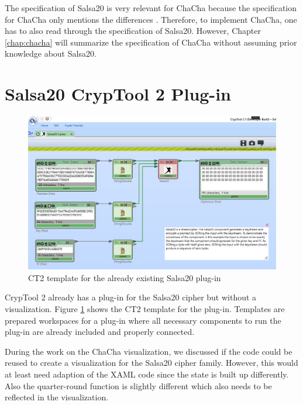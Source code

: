 The specification of Salsa20 is very relevant for ChaCha because the specification for ChaCha only mentions the differences \cite{chachaspec}. Therefore, to implement ChaCha, one has to also read through the specification of Salsa20.  However, Chapter \ref{chap:chacha} will summarize the specification of ChaCha without assuming prior knowledge about Salsa20.


\section{Salsa20 CrypTool 2 Plug-in}
\label{sec:salsaCT2Plugin}

\begin{figure}
\centering
\includegraphics[width=\textwidth]{figures/ct2/salsa-crop.png}
\caption[Salsa20 CT2 template]{CT2 template for the already existing Salsa20 plug-in}
\label{fig:salsa.template}
\end{figure}

CrypTool 2 already has a plug-in for the Salsa20 cipher but without a visualization. Figure \ref{fig:salsa.template} shows the CT2 template for the plug-in. Templates are prepared workspaces for a plug-in where all necessary components to run the plug-in are already included and properly connected.

During the work on the ChaCha visualization, we discussed if the code could be reused to create a visualization for the Salsa20 cipher family. However, this would at least need adaption of the XAML code since the state is built up differently. Also the quarter-round function is slightly different which also needs to be reflected in the visualization.

